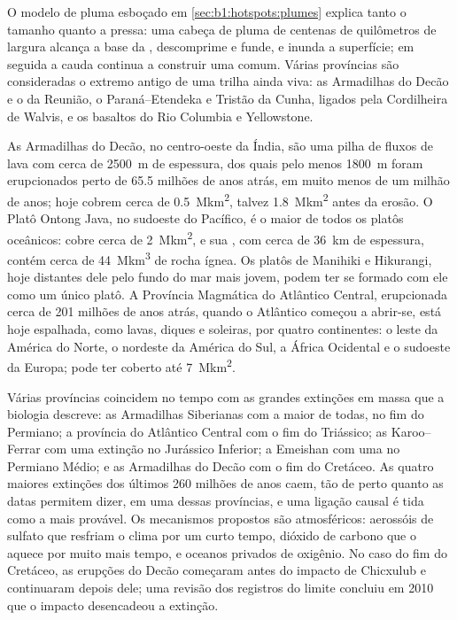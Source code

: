\noindent O modelo de pluma esboçado em \cref{sec:b1:hotspots:plumes} explica tanto o tamanho quanto a pressa: uma cabeça de pluma de centenas de quilômetros de largura alcança a base da , descomprime e funde, e inunda a superfície; em seguida a cauda continua a construir uma  comum. Várias províncias são consideradas o extremo antigo de uma trilha ainda viva: as Armadilhas do Decão e o  da Reunião, o Paraná--Etendeka e Tristão da Cunha, ligados pela Cordilheira de Walvis, e os basaltos do Rio Columbia e Yellowstone.

As Armadilhas do Decão, no centro-oeste da Índia, são uma pilha de fluxos de lava com cerca de \qty{2500}{m} de espessura, dos quais pelo menos \qty{1800}{m} foram erupcionados perto de 65.5 milhões de anos atrás, em muito menos de um milhão de anos; hoje cobrem cerca de \qty{0.5}{\mega km^2}, talvez \qty{1.8}{\mega km^2} antes da erosão. O Platô Ontong Java, no sudoeste do Pacífico, é o maior de todos os platôs oceânicos: cobre cerca de \qty{2}{\mega km^2}, e sua , com cerca de \qty{36}{km} de espessura, contém cerca de \qty{44}{\mega km^3} de rocha ígnea. Os platôs de Manihiki e Hikurangi, hoje distantes dele pelo fundo do mar mais jovem, podem ter se formado com ele como um único platô. A Província Magmática do Atlântico Central, erupcionada cerca de 201 milhões de anos atrás, quando o Atlântico começou a abrir-se, está hoje espalhada, como lavas, diques e soleiras, por quatro continentes: o leste da América do Norte, o nordeste da América do Sul, a África Ocidental e o sudoeste da Europa; pode ter coberto até \qty{7}{\mega km^2}.


Várias províncias coincidem no tempo com as grandes extinções em massa que a biologia descreve: as Armadilhas Siberianas com a maior de todas, no fim do Permiano; a província do Atlântico Central com o fim do Triássico; as Karoo--Ferrar com uma extinção no Jurássico Inferior; a Emeishan com uma no Permiano Médio; e as Armadilhas do Decão com o fim do Cretáceo. As quatro maiores extinções dos últimos 260 milhões de anos caem, tão de perto quanto as datas permitem dizer, em uma dessas províncias, e uma ligação causal é tida como a mais provável. Os mecanismos propostos são atmosféricos: aerossóis de sulfato que resfriam o clima por um curto tempo, dióxido de carbono que o aquece por muito mais tempo, e oceanos privados de oxigênio. No caso do fim do Cretáceo, as erupções do Decão começaram antes do impacto de Chicxulub e continuaram depois dele; uma revisão dos registros do limite concluiu em 2010 que o impacto desencadeou a extinção.


